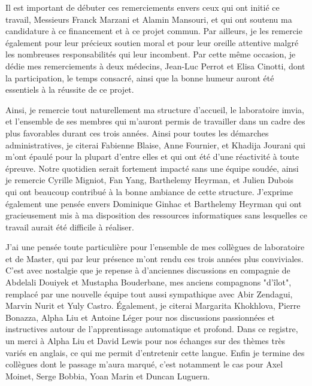 \documentclass[english,standardlists]{spimubphdthesis}
\begin{document}
Il est important de débuter ces remerciements envers ceux qui ont initié ce travail, Messieurs Franck Marzani et Alamin Mansouri, et qui ont soutenu ma candidature à ce financement et à ce projet commun. Par ailleurs, je les remercie également pour leur précieux soutien moral et pour leur oreille attentive malgré les nombreuses responsabilités qui leur incombent. Par cette même occasion, je dédie mes remerciements à deux médecins, Jean-Luc Perrot et Elisa Cinotti, dont la participation, le temps consacré, ainsi que la bonne humeur auront été essentiels à la réussite de ce projet.\par


Ainsi, je remercie tout naturellement ma structure d'accueil, le laboratoire \gls{imvia}, et l'ensemble de ses membres qui m'auront permis de travailler dans un cadre des plus favorables durant ces trois années. Ainsi pour toutes les démarches administratives, je citerai Fabienne Blaise, Anne Fournier, et Khadija Jourani qui m'ont épaulé pour la plupart d'entre elles et qui ont été d'une réactivité à toute épreuve. Notre quotidien serait fortement impacté sans une équipe soudée, ainsi je remercie Cyrille Migniot, Fan Yang, Barthelemy Heyrman, et Julien Dubois qui ont beaucoup contribué à la bonne ambiance de cette structure. J'exprime également une pensée envers Dominique Ginhac et Barthelemy Heyrman qui ont gracieusement mis à ma disposition des ressources informatiques sans lesquelles ce travail aurait été difficile à réaliser.\par

J'ai une pensée toute particulière pour l'ensemble de mes collègues de laboratoire et de Master, qui par leur présence m'ont rendu ces trois années plus conviviales. C'est avec nostalgie que je repense à d'anciennes discussions en compagnie de Abdelali Douiyek et Mustapha Bouderbane, mes anciens compagnons "d'îlot", remplacé par une nouvelle équipe tout aussi sympathique avec Abir Zendagui, Marvin Nurit et Yuly Castro. Également, je citerai Margarita Khokhlova, Pierre Bonazza, Alpha Liu et Antoine Léger pour nos discussions passionnées et instructives autour de l'apprentissage automatique et profond. Dans ce registre, un merci à Alpha Liu et David Lewis pour nos échanges sur des thèmes très variés en anglais, ce qui me permit d'entretenir cette langue. Enfin je termine des collègues dont le passage m'aura marqué, c'est notamment le cas pour Axel Moinet, Serge Bobbia, Yoan Marin et Duncan Luguern.\par
\end{document}
